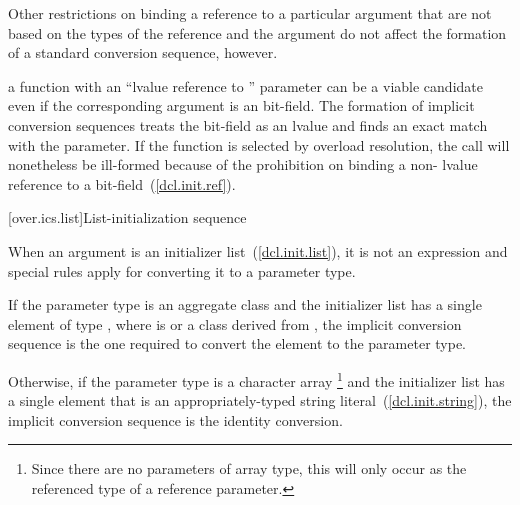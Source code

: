 \pnum
Other restrictions on binding a reference to a particular argument
that are not based on the types of the reference and the argument
do not affect the formation of a standard conversion
sequence, however.
\begin{example}
a function with an ``lvalue reference to '' parameter can
be a viable candidate even if the corresponding argument is an
bit-field.
The formation of implicit conversion sequences
treats the
bit-field as an
lvalue and finds an exact
match with the parameter.
If the function is selected by overload
resolution, the call will nonetheless be ill-formed because of
the prohibition on binding a non- lvalue reference to a bit-field~(\ref{dcl.init.ref}).
\end{example}

[over.ics.list]{List-initialization sequence}

\pnum
When an argument is an initializer list~(\ref{dcl.init.list}), it is not an
expression and special rules apply for converting it to a parameter type.

\pnum
If the parameter type is an aggregate class  and the initializer list has a
single element of type \cv{} , where  is 
or a class derived from , the implicit conversion sequence is the one
required to convert the element to the parameter type.

\pnum
Otherwise, if the parameter type is a character array%
\footnote{Since there are no parameters of array type,
this will only occur as the referenced type of a reference parameter.}
and the initializer list has a single element that is an appropriately-typed
string literal~(\ref{dcl.init.string}), the implicit conversion
sequence is the identity conversion.

